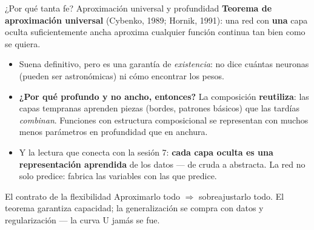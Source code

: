 \documentclass{beamer}
\newcommand{\1}{\mathbb{I}}
\begin{document}
\begin{frame}{¿Por qué tanta fe? Aproximación universal y profundidad}
\small
\textbf{Teorema de aproximación universal} (Cybenko, 1989; Hornik, 1991): una red con \textbf{una} capa oculta suficientemente ancha aproxima cualquier función continua tan bien como se quiera.
\pause

\begin{itemize}\itemsep5pt
  \item Suena definitivo, pero es una garantía de \emph{existencia}: no dice cuántas neuronas (pueden ser astronómicas) ni cómo encontrar los pesos. \pause
  \item \textbf{¿Por qué profundo y no ancho, entonces?} La composición \textbf{reutiliza}: las capas tempranas aprenden piezas (bordes, patrones básicos) que las tardías \emph{combinan}. Funciones con estructura composicional se representan con muchos menos parámetros en profundidad que en anchura. \pause
  \item Y la lectura que conecta con la sesión 7: \textbf{cada capa oculta es una representación aprendida} de los datos --- de cruda a abstracta. La red no solo predice: fabrica las variables con las que predice.
\end{itemize}
\pause

\begin{block}{El contrato de la flexibilidad}
Aproximarlo todo $\Rightarrow$ sobreajustarlo todo. El teorema garantiza capacidad; la generalización se compra con datos y regularización --- la curva U jamás se fue.
\end{block}
\end{frame}
\end{document}
